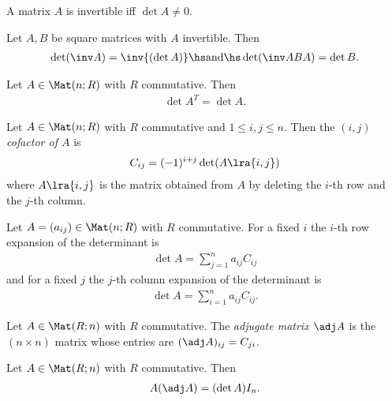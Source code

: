 \documentclass{article}
\begin{document}
\begin{theorem}[Notes 4.4.2]
    A matrix $A$ is invertible iff $\det A \not= 0$.
\end{theorem}

\begin{corollary}
    Let $A,B$ be square matrices with $A$ invertible. Then
    \begin{align*}
        \det (\inv A) = \inv{(\det A)} \hs\text{and}\hs
        \det (\inv ABA) = \det B.
    \end{align*} 
\end{corollary}

\begin{lemma}[Notes 4.4.4]
    Let $A\in\Mat(n;R)$ with $R$ commutative. Then 
    \begin{align*}
        \det A^T = \det A.
    \end{align*} 
\end{lemma}

\begin{definition}
    Let $A\in\Mat(n;R)$ with $R$ commutative and $1\leq i,j\leq n$.  Then the \emph{$(i,j)$ cofactor of $A$} is
    \begin{align*}
        C_{ij}=(-1)^{i+j}\det(A\lra{i,j})
    \end{align*}
    where $A\lra{i,j}$ is the matrix obtained from $A$ by deleting the $i$-th row and the $j$-th column.
\end{definition}

\begin{theorem}[Notes 4.4.7]
    Let $A=(a_{ij})\in\Mat(n; R)$ with $R$ commutative. For a fixed $i$ the $i$-th row expansion 
    of the determinant is 
    \begin{align*}
        \det A = \sum_{j=1}^n a_{ij}C_{ij}
    \end{align*}
    and for a fixed $j$ the $j$-th column expansion of the determinant is 
    \begin{align*}
        \det A = \sum_{i=1}^n a_{ij}C_{ij}.
    \end{align*}
\end{theorem}

\begin{definition}
    Let $A\in\Mat(R;n)$ with $R$ commutative. The \emph{adjugate matrix $\adj A$} is the 
    $(n\times n)$ matrix whose entries are $(\adj A)_{ij} = C_{ji}$.
\end{definition}

\begin{theorem}
    Let $A\in\Mat(R;n)$ with $R$ commutative. Then 
    \begin{align*}
        A(\adj A) = (\det A)I_n.
    \end{align*} 
\end{theorem}
\end{document}
